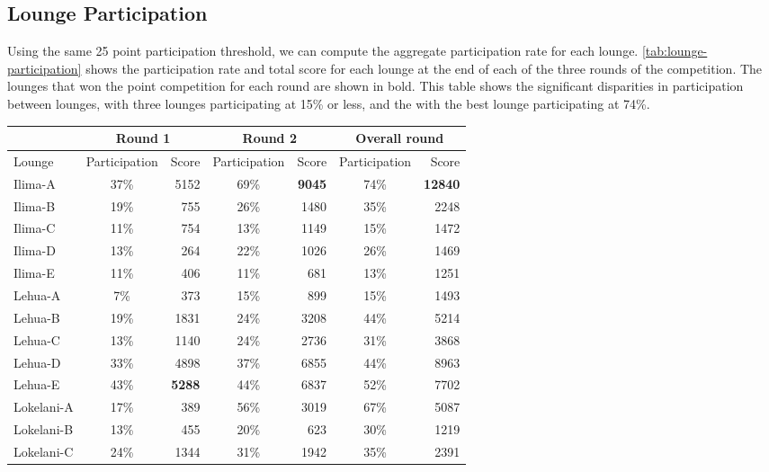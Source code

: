 \subsection{Lounge Participation}

Using the same 25 point participation threshold, we can compute the aggregate participation rate for each lounge. \autoref{tab:lounge-participation} shows the participation rate and total score for each lounge at the end of each of the three rounds of the competition. The lounges that won the point competition for each round are shown in bold. This table shows the significant disparities in participation between lounges, with three lounges participating at 15\% or less, and the with the best lounge participating at 74\%.

\begin{table}[htbp]
	\centering
		\begin{tabular}{| l | c | r | c | r | c | r |}
			\hline
			 & \multicolumn{2}{|c|}{Round 1} & \multicolumn{2}{|c|}{Round 2} & \multicolumn{2}{|c|}{Overall round} \\ \hline
			Lounge & Participation & Score & Participation & Score & Participation & Score \\ \hline \hline
			Ilima-A & 37\% & 5152 & 69\% & \textbf{9045} & 74\% & \textbf{12840} \\ \hline
			Ilima-B & 19\% & 755 & 26\% & 1480 & 35\% & 2248 \\ \hline
			Ilima-C & 11\% & 754 & 13\% & 1149 & 15\% & 1472 \\ \hline
			Ilima-D & 13\% & 264 & 22\% & 1026 & 26\% & 1469 \\ \hline
			Ilima-E & 11\% & 406 & 11\% & 681 & 13\% & 1251 \\ \hline
			Lehua-A & 7\% & 373 & 15\% & 899 & 15\% & 1493 \\ \hline
			Lehua-B & 19\% & 1831 & 24\% & 3208 & 44\% & 5214 \\ \hline
			Lehua-C & 13\% & 1140 & 24\% & 2736 & 31\% & 3868 \\ \hline
			Lehua-D & 33\% & 4898 & 37\% & 6855 & 44\% & 8963 \\ \hline
			Lehua-E & 43\% & \textbf{5288} & 44\% & 6837 & 52\% & 7702 \\ \hline
			Lokelani-A & 17\% & 389 & 56\% & 3019 & 67\% & 5087 \\ \hline
			Lokelani-B & 13\% & 455 & 20\% & 623 & 30\% & 1219 \\ \hline
			Lokelani-C & 24\% & 1344 & 31\% & 1942 & 35\% & 2391 \\ \hline

\end{tabular}
\end{table}
